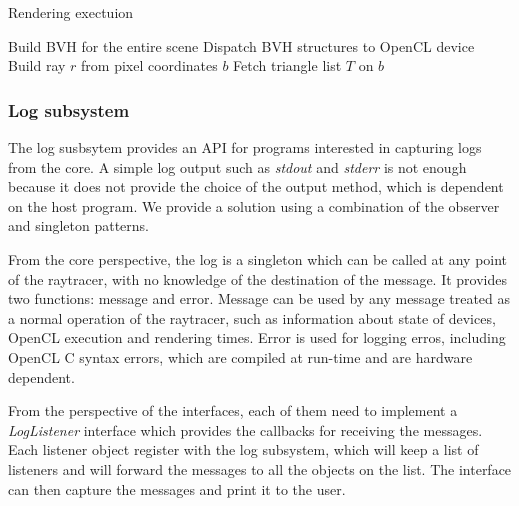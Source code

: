 \documentclass[a4paper]{sbgames}               %
\begin{document}
\begin{algorithm}
\caption{Rendering exectuion}
\label{alg:rendering}
\begin{algorithmic}[1]
\State Build BVH for the entire scene
\State Dispatch BVH structures to OpenCL device
\EndProcedure
{}
\State Build ray $r$ from pixel coordinates
\Return $b$
\EndIf
\EndFor
\State Fetch triangle list $T$ on $b$
\EndIf
\EndFor
\EndFor
\EndProcedure
\end{algorithmic}
\end{algorithm}


\subsubsection{Log subsystem}

The log susbsytem provides an API for programs interested in capturing
logs from the core. A simple log output such as \emph{stdout} and
\emph{stderr} is not enough because it does not provide the choice of
the output method, which is dependent on the host program. We provide
a solution using a combination of the observer and singleton patterns.

From the core perspective, the log is a singleton which can be called
at any point of the raytracer, with no knowledge of the destination of
the message. It provides two functions: message and error. Message can
be used by any message treated as a normal operation of the raytracer,
such as information about state of devices, OpenCL execution and
rendering times. Error is used for logging erros, including OpenCL C
syntax errors, which are compiled at run-time and are hardware
dependent.

From the perspective of the interfaces, each of them need to implement
a \emph{LogListener} interface which provides the callbacks for
receiving the messages. Each listener object register with the log
subsystem, which will keep a list of listeners and will forward the
messages to all the objects on the list. The interface can then
capture the messages and print it to the user.
\end{document}
